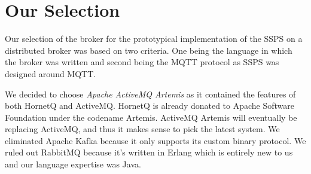 \section{Our Selection}

Our selection of the broker for the prototypical implementation of the SSPS on a distributed broker was based on two criteria. One being the language in which the broker was written and second being the MQTT protocol as SSPS was designed around MQTT.

We decided to choose \textit{Apache ActiveMQ Artemis} as it contained the features of both HornetQ and ActiveMQ. HornetQ is already donated to Apache Software Foundation under the codename Artemis. ActiveMQ Artemis will eventually be replacing ActiveMQ, and thus it makes sense to pick the latest system. We eliminated Apache Kafka because it only supports its custom binary protocol. We ruled out RabbitMQ because it's written in Erlang which is entirely new to us and our language expertise was Java.


